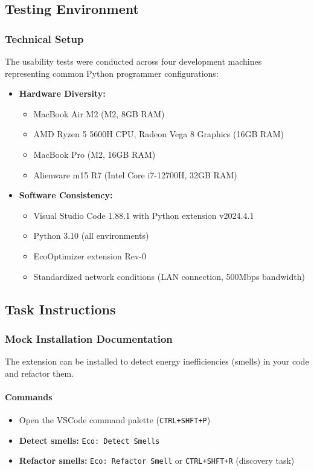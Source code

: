 \documentclass{article}
\begin{document}
\subsection{Testing Environment}
\subsubsection{Technical Setup}
The usability tests were conducted across four development machines representing common Python programmer configurations:

\begin{itemize}
    \item \textbf{Hardware Diversity:}
    \begin{itemize}
        \item MacBook Air M2 (M2, 8GB RAM)
        \item AMD Ryzen 5 5600H CPU, Radeon Vega 8 Graphics (16GB RAM)
        \item MacBook Pro (M2, 16GB RAM)
        \item Alienware m15 R7 (Intel Core i7-12700H, 32GB RAM)
    \end{itemize}
    
    \item \textbf{Software Consistency:}
    \begin{itemize}
        \item Visual Studio Code 1.88.1 with Python extension v2024.4.1
        \item Python 3.10 (all environments)
        \item EcoOptimizer extension Rev-0
        \item Standardized network conditions (LAN connection, 500Mbps bandwidth)
    \end{itemize}
\end{itemize}

\subsection{Task Instructions}
\label{subsec:tasks}

\subsubsection{Mock Installation Documentation}
The extension can be installed to detect energy inefficiencies (smells) in your code and refactor them.

\paragraph{Commands}
\begin{itemize}
    \item Open the VSCode command palette (\texttt{CTRL+SHFT+P})
    \item \textbf{Detect smells:} \texttt{Eco: Detect Smells}
    \item \textbf{Refactor smells:} \texttt{Eco: Refactor Smell} or \texttt{CTRL+SHFT+R} (discovery task)
\end{itemize}
\end{document}
